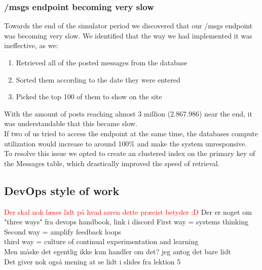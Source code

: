 

\subsubsection{/msgs endpoint becoming very slow}
Towards the end of the simulator period we discovered that our /msgs endpoint was becoming very slow.
We identified that the way we had implemented it was ineffective, as we: 
\begin{enumerate}
    \item Retrieved all of the posted messages from the database
    \item Sorted them according to the date they were entered 
    \item Picked the top 100 of them to show on the site
\end{enumerate}
With the amount of posts reaching almost 3 million (2.867.986) near the end, it was understandable that this became slow. \\ 
If two of us tried to access the endpoint at the same time, the databases compute utilization would increase to around 100\% and make the system unresponsive. \\
To resolve this issue we opted to create an clustered index on the primary key of the Messages table, which drastically improved the speed of retrieval.



\subsection{DevOps style of work}
\textcolor{red}{Der skal nok læses lidt på hvad søren dette præcist betyder :D}
Der er noget om "three ways" fra devops handbook, link i discord 
First way = systems thinking \\
Second way = amplify feedback loops \\
third way = culture of continual experimentation and learning \\
Men måske det egentlig ikke kun handler om det? jeg antog det bare lidt \\
Det giver nok også mening at se lidt i slides fra lektion 5


